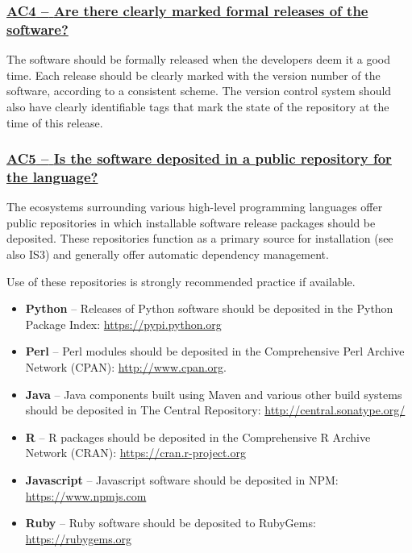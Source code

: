 \documentclass[a4paper,11pt]{article}
\newcommand{\indicator}[1]{\subsubsection*{\underline{#1}}}
\begin{document}
\newcommand{\acFourName}{AC4}
\newcommand{\acFourID}{\acFourName}
\newcommand{\acFourText}{Are there clearly marked formal releases of the software?}
\indicator{\acFourName{ }--{ }\acFourText}\label{id:ac4} 

The software should be formally released when the developers deem it a good
time. Each release should be clearly marked with the version number of the
software, according to a consistent scheme. The version control system should
also have clearly identifiable tags that mark the state of the repository at
the time of this release.

\newcommand{\acFiveName}{AC5}
\newcommand{\acFiveID}{\acFiveName}
\newcommand{\acFiveText}{Is the software deposited in a public repository for the language?}
\indicator{\acFiveName{ }--{ }\acFiveText}\label{id:ac5} 

The ecosystems surrounding various high-level programming languages offer
public repositories in which installable software release packages should be
deposited. These repositories function as a primary source for installation (see also
IS3) and generally offer automatic dependency management.

Use of these repositories is strongly recommended practice if available.

\begin{itemize}
    \item \textbf{Python} -- Releases of Python software should be deposited in
        the Python Package Index: \url{https://pypi.python.org}
    \item \textbf{Perl} --  Perl modules should be deposited in the Comprehensive
        Perl Archive Network (CPAN): \url{http://www.cpan.org}.
    \item \textbf{Java} -- Java components built using Maven and various other
        build systems should be deposited in The Central Repository: \url{http://central.sonatype.org/}
    \item \textbf{R} -- R packages should be deposited in the Comprehensive R
        Archive Network (CRAN): \url{https://cran.r-project.org}
    \item \textbf{Javascript} -- Javascript software should be deposited in
        NPM: \url{https://www.npmjs.com}
    \item \textbf{Ruby} -- Ruby software should be deposited to 
        RubyGems: \url{https://rubygems.org}
\end{itemize}
\end{document}
